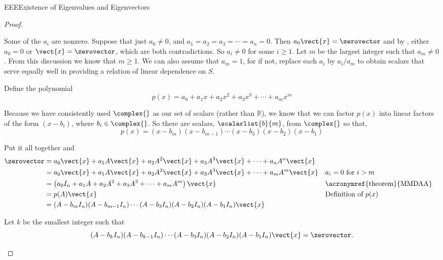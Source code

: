 \begin{subsect}{EEE}{Existence of Eigenvalues and Eigenvectors}
\begin{proof}
%
\begin{para}Some of the $a_i$ are nonzero.  Suppose that just $a_0\neq 0$, and $a_1=a_2=a_3=\cdots=a_n=0$.  Then $a_0\vect{x}=\zerovector$ and by , either $a_0=0$ or $\vect{x}=\zerovector$, which are both contradictions.  So $a_i\neq 0$ for some $i\geq 1$.  Let $m$ be the largest integer such that $a_m\neq 0$.  From this discussion we know that $m\geq 1$.  We can also assume that $a_m=1$, for if not, replace each $a_i$ by $a_i/a_m$ to obtain scalars that serve equally well in providing a relation of linear dependence on $S$.\end{para}
%
\begin{para}Define the polynomial
%
\begin{equation*}
p(x)=a_0+a_1x+a_2x^2+a_3x^3+\cdots+a_mx^m
\end{equation*}
\end{para}
%
\begin{para}Because we have consistently used $\complex{\null}$ as our set of scalars (rather than ${\mathbb R}$), we know that we can factor $p(x)$ into linear factors of the form $(x-b_i)$, where $b_i\in\complex{\null}$.  So there are scalars, $\scalarlist{b}{m}$, from $\complex{\null}$ so that,
%
\begin{equation*}
p(x)=(x-b_m)(x-b_{m-1})\cdots(x-b_3)(x-b_2)(x-b_1)
\end{equation*}
\end{para}
%
\begin{para}Put it all together and
%
\begin{align*}
\zerovector&=a_0\vect{x}+a_1A\vect{x}+a_2A^2\vect{x}+a_3A^3\vect{x}+\cdots+a_nA^n\vect{x}\\
&=a_0\vect{x}+a_1A\vect{x}+a_2A^2\vect{x}+a_3A^3\vect{x}+\cdots+a_mA^m\vect{x}&&\text{$a_i=0$ for $i>m$}\\
&=\left(a_0I_n+a_1A+a_2A^2+a_3A^3+\cdots+a_mA^m\right)\vect{x}&&\text{\acronymref{theorem}{MMDAA}}\\
&=p(A)\vect{x}&&\text{Definition of $p(x)$}\\
&=(A-b_mI_n)(A-b_{m-1}I_n)\cdots(A-b_3I_n)(A-b_2I_n)(A-b_1I_n)\vect{x}
\end{align*}
\end{para}
%
\begin{para}Let $k$ be the smallest integer such that
%
\begin{equation*}
(A-b_kI_n)(A-b_{k-1}I_n)\cdots(A-b_3I_n)(A-b_2I_n)(A-b_1I_n)\vect{x}=\zerovector.
\end{equation*}

\end{para}
\end{proof}
\end{subsect}
